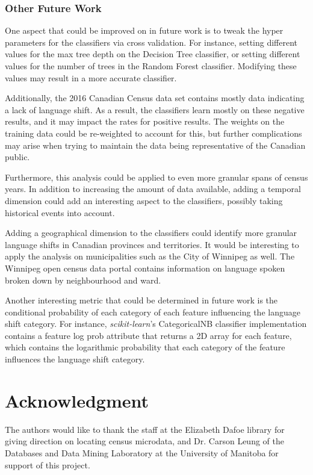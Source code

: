 \documentclass[10pt, conference, compsocconf]{IEEEtran}
\begin{document}
\subsubsection{Other Future Work}

One aspect that could be improved on in future work is to tweak the hyper parameters for the classifiers via cross validation. For instance, setting different values for the max tree depth on the Decision Tree classifier, or setting different values for the number of trees in the Random Forest classifier. Modifying these values may result in a more accurate classifier.

Additionally, the 2016 Canadian Census data set contains mostly data indicating a lack of language shift. As a result, the classifiers learn mostly on these negative results, and it may impact the rates for positive results. The weights on the training data could be re-weighted to account for this, but further complications may arise when trying to maintain the data being representative of the Canadian public.

Furthermore, this analysis could be applied to even more granular spans of census years. In addition to increasing the amount of data available, adding a temporal dimension could add an interesting aspect to the classifiers, possibly taking historical events into account.

Adding a geographical dimension to the classifiers could identify more granular language shifts in Canadian provinces and territories. It would be interesting to apply the analysis on municipalities such as the City of Winnipeg as well. The Winnipeg open census data portal contains information on language spoken broken down by neighbourhood and ward.

Another interesting metric that could be determined in future work is the conditional probability of each category of each feature influencing the language shift category. For instance, \textit{scikit-learn}'s CategoricalNB classifier implementation contains a feature log prob attribute that returns a 2D array for each feature, which contains the logarithmic probability that each category of the feature influences the language shift category.

\section*{Acknowledgment}


The authors would like to thank the staff at the Elizabeth Dafoe library for giving direction on locating census microdata, and Dr. Carson Leung of the Databases and Data Mining Laboratory at the University of Manitoba for support of this project.





\end{document}
